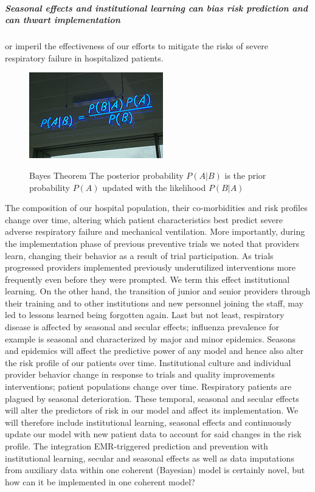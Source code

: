 \documentclass[11pt,notitlepage]{article}
\begin{document}
\subparagraph*{Seasonal effects and institutional learning can bias risk prediction and can thwart implementation} or imperil the effectiveness of our efforts to mitigate the risks of severe respiratory failure in hospitalized patients. 
\begin{figure} %
 \vspace{-10pt}
 \href{http://en.wikipedia.org/wiki/Bayes'_theorem}{ \includegraphics[scale=0.6]{Figures/BayesTheorem.jpg}}
  \vspace{-20pt}
 \caption{\footnotesize Bayes Theorem \cite{Thomas_Bayes} The posterior probability $P(A|B)$ is the prior probability $P(A)$ updated with the  likelihood $P(B|A)$}
 \vspace{-15pt}
 \label{fig:BayesTheorem}
\end{figure} The composition of our hospital population, their co-morbidities and risk profiles change over time, altering which patient characteristics best predict severe adverse respiratory failure and mechanical ventilation. More importantly,  during the implementation phase of previous preventive trials we noted that providers learn, changing their behavior as a result of trial participation. As trials progressed providers implemented previously underutilized interventions more frequently even before they were prompted. We term this effect institutional learning. On the other hand, the transition of junior and senior providers through their training and to other institutions and new personnel joining the staff, may led to lessons learned being forgotten again. Last but not least, respiratory disease is affected by seasonal and secular effects; influenza prevalence for example is seasonal and characterized by major and minor epidemics. Seasons and epidemics will affect the predictive power of any model and hence also alter the risk profile of our patients over time. Institutional culture and individual provider behavior change in response to trials and quality improvements interventions; patient populations change over time. Respiratory patients are plagued by seasonal deterioration. These temporal, seasonal and secular effects will alter the predictors of risk in our model and affect its implementation. We will therefore include institutional learning, seasonal effects and continuously update our model with new patient data to account for said changes in the risk profile. The integration EMR-triggered prediction and prevention with  institutional learning, secular and seasonal effects as well as data imputations from auxiliary data within one coherent (Bayesian) model is certainly novel, but how can it be implemented in one coherent model? 
\end{document}

